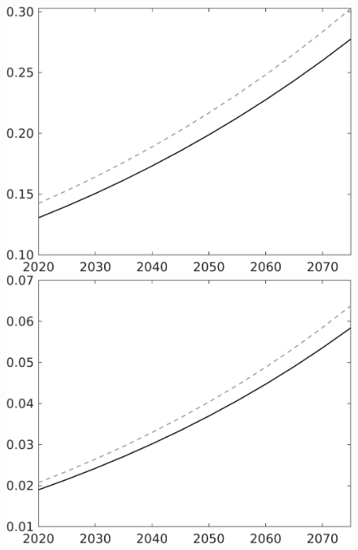 \documentclass[12pt]{article}
\begin{document}
\begin{figure}[h!!]
\begin{minipage}[]{0.32\textwidth}
	\end{minipage}	
	\begin{minipage}[]{0.32\textwidth}
		\includegraphics[width=1\textwidth]{../../codding_model/own_basedOnFried/optimalPol_010922_revision/figures/all_13Sept22/CompTaul_LFBAU_Reg0_F_spillover0_nsk0_xgr0_knspil0_sep1_countec0_GovRev0_etaa0.79_lgd0.png}
	\end{minipage}	
	\begin{minipage}[]{0.32\textwidth}
		\includegraphics[width=1\textwidth]{../../codding_model/own_basedOnFried/optimalPol_010922_revision/figures/all_13Sept22/CompTaul_LFBAU_Reg0_G_spillover0_nsk0_xgr0_knspil0_sep1_countec0_GovRev0_etaa0.79_lgd0.png}

\end{minipage}
\end{figure}
\end{document}
